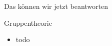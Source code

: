 \begin{frame}[fragile]{Das können wir jetzt beantworten}
	\begin{alertblock}{Gruppentheorie}
		\begin{itemize}
			\item todo
		\end{itemize}
	\end{alertblock}
\end{frame}